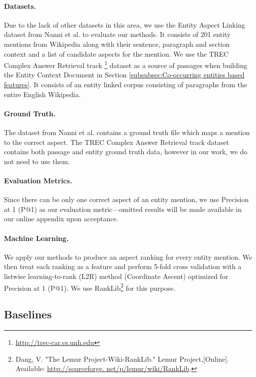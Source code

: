 \documentclass[sigconf,authordraft]{acmart}
\begin{document}
\paragraph{\textbf{Datasets.}}
Due to the lack of other datasets in this area, we use the Entity Aspect Linking dataset from Nanni et al.\cite{nanni2018entity} to evaluate our methods. It consists of 201 entity mentions from Wikipedia along with their sentence, paragraph and section context and a list of candidate aspects for the mention.  We use the TREC Complex Answer Retrieval track \cite{dietz2018trec}\footnote{\url{http://trec-car.cs.unh.edu}} dataset as a source of passages when building the Entity Context Document in Section \ref{subsubsec:Co-occurring entities based features}. It consists of an entity linked corpus consisting of paragraphs from the entire English Wikipedia.

\paragraph{\textbf{Ground Truth.}} The dataset from Nanni et al. \cite{nanni2018entity} contains a ground truth file which maps a mention to the correct aspect. The TREC Complex Answer Retrieval track \cite{dietz2018trec} dataset contains both passage and entity ground truth data, however in our work, we do not need to use them. 

\paragraph{\textbf{Evaluation Metrics.}} Since there can be only one correct aspect of an entity mention, we use Precision at 1 (P@1) as our evaluation metric---omitted results will be made available in our online appendix upon acceptance.   

\paragraph{\textbf{Machine Learning.}}
We apply our methods to produce an aspect ranking for every entity mention. We then treat each ranking as a feature and perform 5-fold cross validation with a listwise learning-to-rank (L2R) method (Coordinate Ascent) optimized for Precision at 1 (P@1). We use RankLib\footnote{Dang, V. "The Lemur Project-Wiki-RankLib." Lemur Project,[Online]. Available: \url{http://sourceforge. net/p/lemur/wiki/RankLib}.} for this purpose. 

\subsection{Baselines}
\label{subsec:Baselines}
\end{document}
